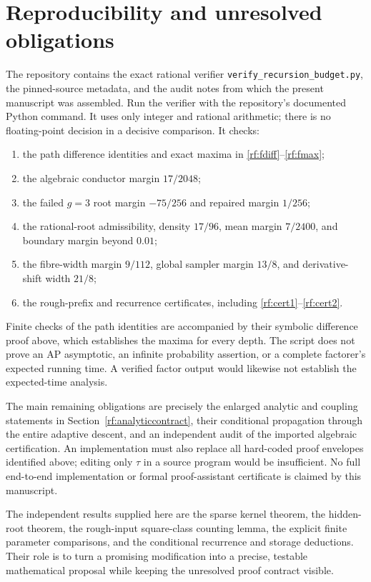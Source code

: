 \section{Reproducibility and unresolved obligations}
\label{rf:reproducibility}

The repository contains the exact rational verifier
\texttt{verify\_recursion\_budget.py}, the pinned-source metadata,
and the audit notes from which the present manuscript was
assembled.  Run the verifier with the repository's documented
Python command.  It uses only integer and rational arithmetic;
there is no floating-point decision in a decisive comparison.
It checks:
\begin{enumerate}[leftmargin=*]
\item the path difference identities and exact maxima in
\eqref{rf:fdiff}--\eqref{rf:fmax};
\item the algebraic conductor margin $17/2048$;
\item the failed $g=3$ root margin $-75/256$ and repaired margin
$1/256$;
\item the rational-root admissibility, density $17/96$, mean
margin $7/2400$, and boundary margin beyond $0.01$;
\item the fibre-width margin $9/112$, global sampler margin
$13/8$, and derivative-shift width $21/8$;
\item the rough-prefix and recurrence certificates, including
\eqref{rf:cert1}--\eqref{rf:cert2}.
\end{enumerate}
Finite checks of the path identities are accompanied by their
symbolic difference proof above, which establishes the maxima
for every depth.  The script does not prove an AP asymptotic,
an infinite probability assertion, or a complete factorer's
expected running time.  A verified factor output would likewise
not establish the expected-time analysis.

The main remaining obligations are precisely the enlarged
analytic and coupling statements in
Section~\ref{rf:analyticcontract}, their conditional propagation
through the entire adaptive descent, and an independent audit
of the imported algebraic certification.  An implementation must
also replace all hard-coded proof envelopes identified above;
editing only $\tau$ in a source program would be insufficient.
No full end-to-end implementation or formal proof-assistant
certificate is claimed by this manuscript.

The independent results supplied here are the sparse kernel
theorem, the hidden-root theorem, the rough-input square-class
counting lemma, the explicit finite parameter
comparisons, and the conditional recurrence and storage
deductions.  Their role is to turn a promising modification
into a precise, testable mathematical proposal while keeping
the unresolved proof contract visible.
